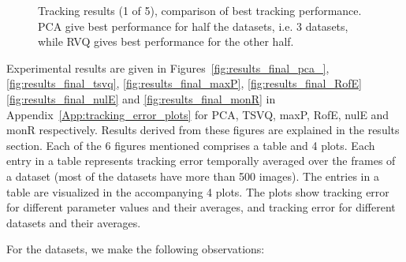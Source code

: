 								\begin{figure}[t]
								\centering
								
								\caption{Tracking results (1 of 5), comparison of best tracking performance.  PCA give best performance for half the datasets, i.e. 3 datasets, while RVQ gives best performance for the other half.}
								\label{fig:results_final_1_best}
								\end{figure}

Experimental results are given in Figures~\ref{fig:results_final_pca_}, \ref{fig:results_final_tsvq}, \ref{fig:results_final_maxP}, \ref{fig:results_final_RofE} \ref{fig:results_final_nulE} and \ref{fig:results_final_monR} in Appendix~\ref{App:tracking_error_plots} for PCA, TSVQ, maxP, RofE, nulE and monR respectively.  Results derived from these figures are explained in the results section.  Each of the 6 figures mentioned comprises a table and 4 plots.  Each entry in a table represents tracking error temporally averaged over the frames of a dataset (most of the datasets have more than 500 images).  The entries in a table are visualized in the accompanying 4 plots.  The plots show tracking error for different parameter values and their averages, and tracking error for different datasets and their averages.  

For the datasets, we make the following observations:

